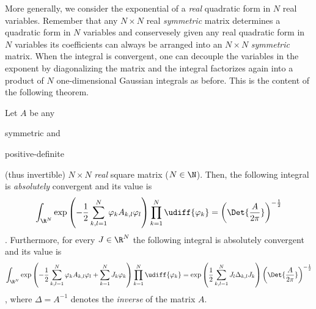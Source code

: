 More generally, we consider the exponential of a \emph{real} quadratic form in
$N$ real variables.
Remember that any $N\times N$  real \emph{symmetric} matrix determines a
quadratic form in $N$ variables and conservesely given any real quadratic form
in $N$ variables its coefficients can always be arranged into an $N\times N$
\emph{symmetric} matrix.
When the integral is convergent, one can decouple the variables in the exponent
by diagonalizing the matrix and
the integral factorizes again into a product of $N$ one-dimensional
Gaussian integrals as before. This is the content of the following theorem.
\begin{theorem}
   Let $A$ be any 
   \begin{inparaenum}[a)]
      \item symmetric and 
      \item positive-definite 
   \end{inparaenum}
   (thus invertible) $N\times N$ \emph{real} square matrix 
   ($N\in\N$). 
   Then, the following integral is
   \emph{absolutely} convergent and its
   value is
   \begin{dmath}[label={piA}]
      \int_{\R^{N}} \exp\left( -\frac{1}{2} \sum_{k,l=1}^{N} \varphi_{k} A_{k,l}
	 \varphi_{l} \right) \prod_{k=1}^{N} \udiff{\varphi_{k}} = \left( \Det{ \frac{A}{2\pi}}
      \right)^{-\frac{1}{2}} 
   \end{dmath}.
   Furthermore, for every $J \in \R^{N}$ the following integral is
   absolutely convergent and its value is 
   \begin{dmath}[label={piAJ}]
      \int_{\R^{N}} \exp\left( -\frac{1}{2} \sum_{k,l=1}^{N} \varphi_{k} A_{k,l}
	 \varphi_{l} + \sum_{k=1}^{N} J_{k} \varphi_{k}\right)  \prod_{k=1}^{N}
      \udiff{\varphi_{k}} =
      \exp\left( \frac{1}{2} \sum_{k,l=1}^{N} J_{l} \Delta_{k,l} J_{k} \right) \left( \Det{ \frac{A}{2\pi}}
      \right)^{-\frac{1}{2}} 
   \end{dmath},
   where $\Delta = A^{-1}$ denotes the \emph{inverse} of the matrix $A$.
\end{theorem}

